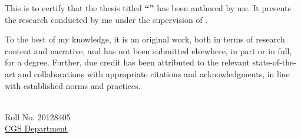 
This is to certify that the thesis titled \textbf{``\ttitle''} has been authored by me. It presents the research conducted by me under the supervision of \textbf{\supnameA}.\par

To the best of my knowledge, it is an original work, both in terms of research content and narrative, and has not been submitted elsewhere, in part or in full, for a degree. Further, due credit has been attributed to the relevant state-of-the-art and collaborations with appropriate citations and acknowledgments, in line with established norms and practices.\\ [2cm]
\begin{minipage}{.5\textwidth}
		\begin{flushleft}
			{\authornames\\ Roll No. 20128405 \\
			\normalsize{\href{https://www.cgs.iitk.ac.in/}{CGS Department}\\
			\univname}}
		\end{flushleft}
\end{minipage}
\vfill

\clearpage %